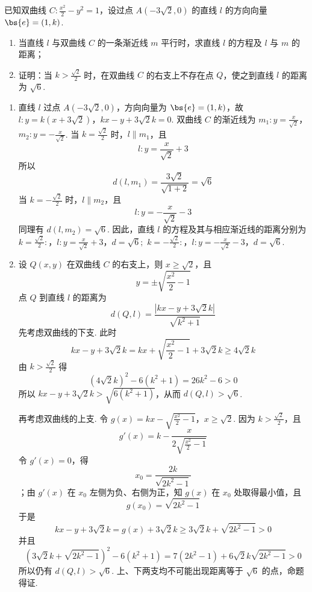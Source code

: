 \begin{problem}
已知双曲线 \(C: \frac{x^2}{2} - y^2 = 1\)，设过点 \(A(-3\sqrt{2}, 0)\) 的直线 \(l\) 的方向向量 \(\bs{e} = (1, k)\).

\begin{enumerate}
\item 当直线 \(l\) 与双曲线 \(C\) 的一条渐近线 \(m\) 平行时，求直线 \(l\) 的方程及 \(l\) 与 \(m\) 的距离；

\item 证明：当 \(k > \frac{\sqrt{2}}{2}\) 时，在双曲线 \(C\) 的右支上不存在点 \(Q\)，使之到直线 \(l\) 的距离为 \(\sqrt{6}\).
\end{enumerate}
\end{problem}

\begin{solution}
\begin{enumerate}
\item 直线 \(l\) 过点 \(A(-3\sqrt{2},0)\)，方向向量为 \(\bs{e}=(1,k)\)，故
\(l:y=k(x+3\sqrt{2})\)，\(kx-y+3\sqrt{2}k=0\).
双曲线 \(C\) 的渐近线为
\(m_1:y=\frac{x}{\sqrt{2}}\)，\(m_2:y=-\frac{x}{\sqrt{2}}\).
当 \(k=\frac{\sqrt{2}}{2}\) 时，\(l\parallel m_1\)，且
\[
l:y=\frac{x}{\sqrt{2}}+3
\]
所以
\[
d(l,m_1)=\frac{3\sqrt{2}}{\sqrt{1+2}}=\sqrt{6}
\]
当 \(k=-\frac{\sqrt{2}}{2}\) 时，\(l\parallel m_2\)，且
\[
l:y=-\frac{x}{\sqrt{2}}-3
\]
同理有 \(d(l,m_2)=\sqrt{6}\). 因此，直线 \(l\) 的方程及其与相应渐近线的距离分别为
\(k=\frac{\sqrt{2}}{2}:\)，\(l:y=\frac{x}{\sqrt{2}}+3\)，\(d=\sqrt{6};\)
\(k=-\frac{\sqrt{2}}{2}:\)，\(l:y=-\frac{x}{\sqrt{2}}-3\)，\(d=\sqrt{6}\).

\item 设 \(Q(x,y)\) 在双曲线 \(C\) 的右支上，则 \(x\geqslant\sqrt{2}\)，且
\[
y=\pm\sqrt{\frac{x^2}{2}-1}
\]
点 \(Q\) 到直线 \(l\) 的距离为
\[
d(Q,l)=\frac{\left|kx-y+3\sqrt{2}k\right|}{\sqrt{k^2+1}}
\]
先考虑双曲线的下支. 此时
\[
kx-y+3\sqrt{2}k=kx+\sqrt{\frac{x^2}{2}-1}+3\sqrt{2}k\geqslant4\sqrt{2}k
\]
由 \(k>\frac{\sqrt{2}}{2}\) 得
\[
(4\sqrt{2}k)^2-6(k^2+1)=26k^2-6>0
\]
所以 \(kx-y+3\sqrt{2}k>\sqrt{6(k^2+1)}\)，从而 \(d(Q,l)>\sqrt{6}\).

再考虑双曲线的上支. 令
\(g(x)=kx-\sqrt{\frac{x^2}{2}-1}\)，\(x\geqslant\sqrt{2}\).
因为 \(k>\frac{\sqrt{2}}{2}\)，且
\[
g'(x)=k-\frac{x}{2\sqrt{\frac{x^2}{2}-1}}
\]
令 \(g'(x)=0\)，得
\[
x_0=\frac{2k}{\sqrt{2k^2-1}}
\]
；由 \(g'(x)\) 在 \(x_0\) 左侧为负、右侧为正，知 \(g(x)\) 在 \(x_0\) 处取得最小值，且
\[
g(x_0)=\sqrt{2k^2-1}
\]
于是
\[
kx-y+3\sqrt{2}k=g(x)+3\sqrt{2}k\geqslant3\sqrt{2}k+\sqrt{2k^2-1}>0
\]
并且
\[
\left(3\sqrt{2}k+\sqrt{2k^2-1}\right)^2-6(k^2+1)
=7(2k^2-1)+6\sqrt{2}k\sqrt{2k^2-1}>0
\]
所以仍有 \(d(Q,l)>\sqrt{6}\). 上、下两支均不可能出现距离等于 \(\sqrt{6}\) 的点，命题得证.
\end{enumerate}
\end{solution}


